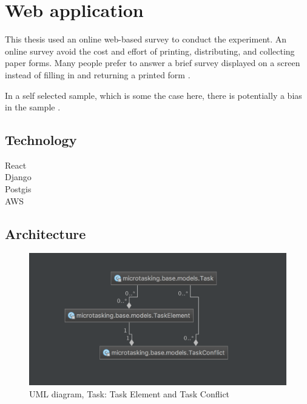 \section{Web application}
This thesis used an online web-based survey to conduct the experiment. An online survey avoid the cost and effort of printing, distributing, and collecting paper forms. Many people prefer to answer a brief survey displayed on a screen instead of filling in and returning a printed form \citep{Ben2009}.   

In a self selected sample, which is some the case here, there is potentially a bias in the sample \citep{Ben2009}. %

\subsection{Technology}
React \\
Django \\
Postgis \\
AWS \\

\subsection{Architecture}

\begin{figure}[H]
	\centering
	\includegraphics[width=0.7\linewidth]{fig/uml_diagram_task2}
	\caption[Task, UML diagram]{UML diagram, Task: Task Element and Task Conflict}
	\label{fig:umldiagramtask2}
\end{figure}


